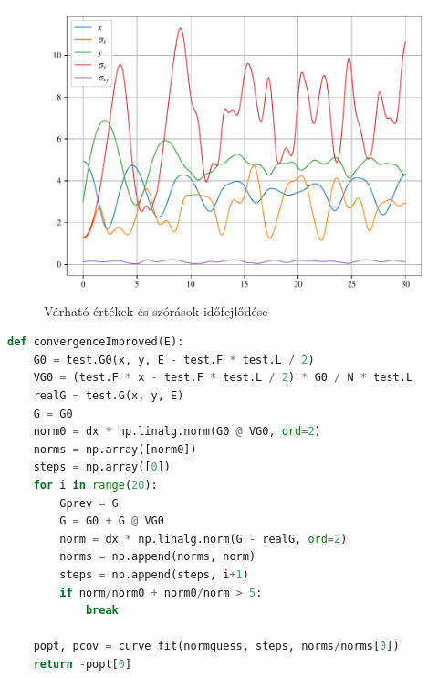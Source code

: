 \begin{figure}[H]
	\includegraphics[scale=1]{./figs/expectations.pdf}
	\caption{Várható értékek és szórások időfejlődése}
\end{figure}


\begin{lstlisting}[language=Python]
def convergenceImproved(E):
    G0 = test.G0(x, y, E - test.F * test.L / 2)
    VG0 = (test.F * x - test.F * test.L / 2) * G0 / N * test.L
    realG = test.G(x, y, E)
    G = G0
    norm0 = dx * np.linalg.norm(G0 @ VG0, ord=2)
    norms = np.array([norm0])
    steps = np.array([0])
    for i in range(20):
        Gprev = G
        G = G0 + G @ VG0
        norm = dx * np.linalg.norm(G - realG, ord=2)
        norms = np.append(norms, norm)
        steps = np.append(steps, i+1)
        if norm/norm0 + norm0/norm > 5:
            break
    
    popt, pcov = curve_fit(normguess, steps, norms/norms[0])
    return -popt[0]
\end{lstlisting}